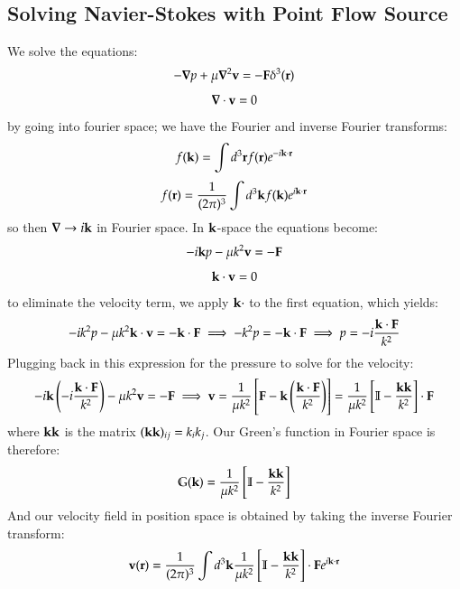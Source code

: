 \subsection{Solving Navier-Stokes with Point Flow Source}
We solve the equations:
\begin{equation}
    -\nabla p + \mu \nabla^2 \v{v} = -\v{F}\delta^3(\v{r})
\end{equation}
\begin{equation}
    \nabla \cdot \v{v} = 0
\end{equation}
by going into fourier space; we have the Fourier and inverse Fourier transforms:
\begin{equation}
    f(\mathbf{k}) = \int d^3\mathbf{r}f(\mathbf{r})e^{-i\mathbf{k}\cdot\mathbf{r}}
\end{equation}
\begin{equation}
    f(\mathbf{r}) = \frac{1}{(2\pi)^3}\int d^3\mathbf{k}f(\mathbf{k})e^{i\mathbf{k} \cdot \mathbf{r}}
\end{equation}
so then $\nabla \to i\v{k}$ in Fourier space. In $\mathbf{k}$-space the equations become:
\begin{equation}
    -i\mathbf{k}p - \mu k^2\mathbf{v} = -\mathbf{F}
\end{equation}
\begin{equation}
    \mathbf{k} \cdot \mathbf{v} = 0
\end{equation}
to eliminate the velocity term, we apply $\mathbf{k} \cdot$ to the first equation, which yields:
\begin{equation}
    -ik^2p - \mu k^2 \mathbf{k} \cdot \mathbf{v} = -\mathbf{k} \cdot \mathbf{F} \implies -k^2p = -\mathbf{k} \cdot \mathbf{F} \implies p = -i\frac{\mathbf{k}\cdot\mathbf{F}}{k^2}
\end{equation}
Plugging back in this expression for the pressure to solve for the velocity:
\begin{equation}
    -i\mathbf{k}\left(-i\frac{\mathbf{k}\cdot\mathbf{F}}{k^2}\right) - \mu k^2\mathbf{v} = -\mathbf{F} \implies \mathbf{v} = \frac{1}{\mu k^2}\left[\mathbf{F} - \mathbf{k}\left(\frac{\mathbf{k} \cdot \mathbf{F}}{k^2}\right)\right] = \frac{1}{\mu k^2}\left[\mathbb{I} - \frac{\mathbf{k} \mathbf{k}}{k^2}\right]\cdot \mathbf{F}
\end{equation}
where $\mathbf{k}\mathbf{k}$ is the matrix $(\mathbf{k}\mathbf{k})_{ij} = k_ik_j$. Our Green's function in Fourier space is therefore:
\begin{equation}
    \mathbb{G}(\mathbf{k}) = \frac{1}{\mu k^2}\left[\mathbb{I} - \frac{\mathbf{k} \mathbf{k}}{k^2}\right]
\end{equation}
And our velocity field in position space is obtained by taking the inverse Fourier transform:
\begin{equation}\label{eq:intermediatev}
    \mathbf{v}(\mathbf{r}) = \frac{1}{(2\pi)^3}\int d^3\mathbf{k}\frac{1}{\mu k^2}\left[\mathbb{I} - \frac{\mathbf{k}\mathbf{k}}{k^2}\right]\cdot\mathbf{F}e^{i\mathbf{k} \cdot \mathbf{r}}
\end{equation}
